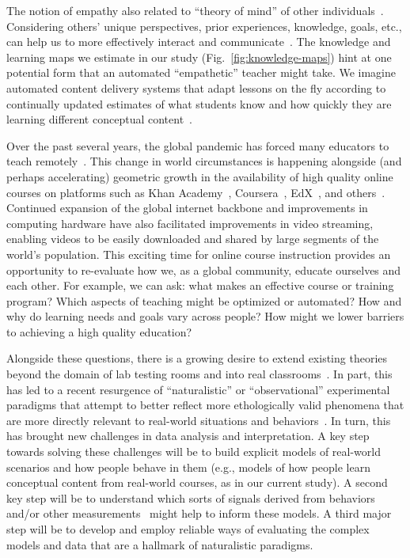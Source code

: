 \documentclass[10pt]{article}
\begin{document}
The notion of empathy also related to ``theory of mind'' of other
individuals~\citep{GoldWinn12, KansEtal15, Melt11}. Considering others' unique
perspectives, prior experiences, knowledge, goals, etc., can help us to more
effectively interact and communicate~\citep{ShaoEtal18, StepBaer06, Ratk18}.
The knowledge and learning maps we estimate in our study
(Fig.~\ref{fig:knowledge-maps}) hint at one potential form that an automated
``empathetic'' teacher might take. We imagine automated content delivery
systems that adapt lessons on the fly according to continually updated
estimates of what students know and how quickly they are learning different
conceptual content~\citep[e.g., building on ideas such as][and
others]{AndeSkwa86, Half88, Kuma05, WolzEtal88}.

Over the past several years, the global pandemic has forced many educators to
teach remotely~\citep{MoseEtal21, ShimLee20, KawaEtal21, Whal20}. This change
in world circumstances is happening alongside (and perhaps accelerating)
geometric growth in the availability of high quality online courses on
platforms such as Khan Academy~\citep{Khan04}, Coursera~\citep{Youn12},
EdX~\citep{Kolo13}, and others~\citep{RhoaEtal13}. Continued expansion of the
global internet backbone and improvements in computing hardware have also
facilitated improvements in video streaming, enabling videos to be easily
downloaded and shared by large segments of the world's population. This
exciting time for online course instruction provides an opportunity to
re-evaluate how we, as a global community, educate ourselves and each other.
For example, we can ask: what makes an effective course or training program?
Which aspects of teaching might be optimized or automated? How and why do
learning needs and goals vary across people? How might we lower barriers to
achieving a high quality education?

Alongside these questions, there is a growing desire to extend existing
theories beyond the domain of lab testing rooms and into real
classrooms~\citep{Kauf03}. In part, this has led to a recent resurgence of
``naturalistic'' or ``observational'' experimental paradigms that attempt to
better reflect more ethologically valid phenomena that are more directly
relevant to real-world situations and behaviors~\citep{NastEtal20}. In turn,
this has brought new challenges in data analysis and interpretation. A key step
towards solving these challenges will be to build explicit models of real-world
scenarios and how people behave in them (e.g., models of how people learn
conceptual content from real-world courses, as in our current study). A second
key step will be to understand which sorts of signals derived from behaviors
and/or other measurements~\citep[e.g., neurophysiological data; ][]{NguyEtal22,
MeshEtal20, PoulEtal17, BeviEtal19, DikkEtal17} might help to inform these
models. A third major step will be to develop and employ reliable ways of
evaluating the complex models and data that are a hallmark of naturalistic
paradigms.
\end{document}

